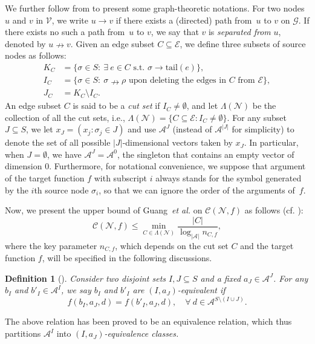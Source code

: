 \documentclass[11pt,draftclsnofoot,onecolumn]{IEEEtran}
\newtheorem{definition}{Definition}
\newcommand{\tail}{\mathrm{tail}}
\begin{document}
We further follow from \cite{Guang_Improved_upper_bound} to present some graph-theoretic notations. For two nodes $u$ and $v$ in $\mathcal{V}$,  we write  $u\rightarrow v$ if there exists a (directed) path from~$u$ to $v$ on $\mathcal{G}$.
If there exists no such a path from~$u$ to $v$, we say that $v$ is \emph{separated from} $u$, denoted by $u\nrightarrow v$.
 Given an edge subset $C\subseteq\mathcal{E}$, we  define three subsets  of  source nodes as follows:
\begin{align*}
K_C &=  \big\{ \sigma\in S:\ \exists\ e\in C \text{ s.t. } \sigma\rightarrow\tail(e) \big\},\label{def_K_C}\\
I_C&= \big\{ \sigma\in S:\ \text{$\sigma\nrightarrow\rho$ upon deleting the edges in $C$ from $\mathcal{E}$} \big\},\\
J_C&=K_C\setminus I_C.
\end{align*}
An edge subset $C$ is said to be a \emph{cut set} if $I_{C}\neq\emptyset$, and let $\Lambda(\mathcal{N})$  be the collection of all the cut sets, i.e.,
$\Lambda(\mathcal{N}) = \{C\subseteq \mathcal{E} : I_{C}\neq\emptyset\} $.
For any subset $J\subseteq S$, we let $x_{J} = (x_{j}:\sigma_{j}\in J) $ and use
$\mathcal{A}^{J}$
(instead of $\mathcal{A}^{|J|}$
for simplicity) to denote the set of
all possible $|J|$-dimensional vectors taken by $x_{J}$. In particular, when $J=\emptyset$, we have
$\mathcal{A}^{J}=\mathcal{A}^{0}$, the
singleton that contains an empty vector of dimension  $0$. Furthermore,
for notational convenience, we suppose that argument of the target function $f$ with subscript $i$ always stands for the symbol generated by the $i$th source node $\sigma_{i}$, so that we can ignore the order of the arguments of~$f$.



Now, we  present the upper bound of Guang~\emph{et al.}  on $\mathcal{C}(\mathcal{N},f)$ as follows (cf. {\cite[Theorem~2]{Guang_Improved_upper_bound}}):
\begin{equation}
\mathcal{C}(\mathcal{N},f)\leq\min_{C\in\Lambda(\mathcal{N})}\frac{|C|}{\log_{|\mathcal{A}|} n_{C,f}},\label{Guang-upper-bound}
\end{equation}
where   the key parameter $n_{C,f}$, which depends on the cut set $C$ and the target function $f$, will be specified in the following discussions.


\begin{definition}[\!]\label{def:I_a_j_equiv}
	Consider two disjoint sets $I,J\subseteq S$ and a fixed $a_{J}\in \mathcal{A}^{J}$. For any $b_{I}$ and $b'_{I}\in \mathcal{A}^{I}$, we say $b_{I}$ and $b'_{I}$ are $(I,a_{J})$-equivalent if
	\begin{equation}\nonumber
		f(b_{I},a_{J},d)=	f(b'_{I},a_{J},d),\quad \forall~ d\in\mathcal{A}^{S\setminus(I\cup J)}.
	\end{equation}
\end{definition}
The above relation has been proved to be an equivalence relation, which thus
partitions $\mathcal{A}^{ I}$ into \emph{$(I,a_{J} )$-equivalence classes.}
\end{document}
